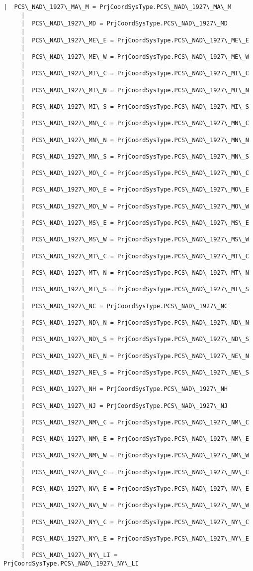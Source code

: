 \documentclass[11pt]{article}
\begin{document}
\begin{Verbatim}[commandchars=\\\{\}]
     |  PCS\_NAD\_1927\_MA\_M = PrjCoordSysType.PCS\_NAD\_1927\_MA\_M
     |  
     |  PCS\_NAD\_1927\_MD = PrjCoordSysType.PCS\_NAD\_1927\_MD
     |  
     |  PCS\_NAD\_1927\_ME\_E = PrjCoordSysType.PCS\_NAD\_1927\_ME\_E
     |  
     |  PCS\_NAD\_1927\_ME\_W = PrjCoordSysType.PCS\_NAD\_1927\_ME\_W
     |  
     |  PCS\_NAD\_1927\_MI\_C = PrjCoordSysType.PCS\_NAD\_1927\_MI\_C
     |  
     |  PCS\_NAD\_1927\_MI\_N = PrjCoordSysType.PCS\_NAD\_1927\_MI\_N
     |  
     |  PCS\_NAD\_1927\_MI\_S = PrjCoordSysType.PCS\_NAD\_1927\_MI\_S
     |  
     |  PCS\_NAD\_1927\_MN\_C = PrjCoordSysType.PCS\_NAD\_1927\_MN\_C
     |  
     |  PCS\_NAD\_1927\_MN\_N = PrjCoordSysType.PCS\_NAD\_1927\_MN\_N
     |  
     |  PCS\_NAD\_1927\_MN\_S = PrjCoordSysType.PCS\_NAD\_1927\_MN\_S
     |  
     |  PCS\_NAD\_1927\_MO\_C = PrjCoordSysType.PCS\_NAD\_1927\_MO\_C
     |  
     |  PCS\_NAD\_1927\_MO\_E = PrjCoordSysType.PCS\_NAD\_1927\_MO\_E
     |  
     |  PCS\_NAD\_1927\_MO\_W = PrjCoordSysType.PCS\_NAD\_1927\_MO\_W
     |  
     |  PCS\_NAD\_1927\_MS\_E = PrjCoordSysType.PCS\_NAD\_1927\_MS\_E
     |  
     |  PCS\_NAD\_1927\_MS\_W = PrjCoordSysType.PCS\_NAD\_1927\_MS\_W
     |  
     |  PCS\_NAD\_1927\_MT\_C = PrjCoordSysType.PCS\_NAD\_1927\_MT\_C
     |  
     |  PCS\_NAD\_1927\_MT\_N = PrjCoordSysType.PCS\_NAD\_1927\_MT\_N
     |  
     |  PCS\_NAD\_1927\_MT\_S = PrjCoordSysType.PCS\_NAD\_1927\_MT\_S
     |  
     |  PCS\_NAD\_1927\_NC = PrjCoordSysType.PCS\_NAD\_1927\_NC
     |  
     |  PCS\_NAD\_1927\_ND\_N = PrjCoordSysType.PCS\_NAD\_1927\_ND\_N
     |  
     |  PCS\_NAD\_1927\_ND\_S = PrjCoordSysType.PCS\_NAD\_1927\_ND\_S
     |  
     |  PCS\_NAD\_1927\_NE\_N = PrjCoordSysType.PCS\_NAD\_1927\_NE\_N
     |  
     |  PCS\_NAD\_1927\_NE\_S = PrjCoordSysType.PCS\_NAD\_1927\_NE\_S
     |  
     |  PCS\_NAD\_1927\_NH = PrjCoordSysType.PCS\_NAD\_1927\_NH
     |  
     |  PCS\_NAD\_1927\_NJ = PrjCoordSysType.PCS\_NAD\_1927\_NJ
     |  
     |  PCS\_NAD\_1927\_NM\_C = PrjCoordSysType.PCS\_NAD\_1927\_NM\_C
     |  
     |  PCS\_NAD\_1927\_NM\_E = PrjCoordSysType.PCS\_NAD\_1927\_NM\_E
     |  
     |  PCS\_NAD\_1927\_NM\_W = PrjCoordSysType.PCS\_NAD\_1927\_NM\_W
     |  
     |  PCS\_NAD\_1927\_NV\_C = PrjCoordSysType.PCS\_NAD\_1927\_NV\_C
     |  
     |  PCS\_NAD\_1927\_NV\_E = PrjCoordSysType.PCS\_NAD\_1927\_NV\_E
     |  
     |  PCS\_NAD\_1927\_NV\_W = PrjCoordSysType.PCS\_NAD\_1927\_NV\_W
     |  
     |  PCS\_NAD\_1927\_NY\_C = PrjCoordSysType.PCS\_NAD\_1927\_NY\_C
     |  
     |  PCS\_NAD\_1927\_NY\_E = PrjCoordSysType.PCS\_NAD\_1927\_NY\_E
     |  
     |  PCS\_NAD\_1927\_NY\_LI = PrjCoordSysType.PCS\_NAD\_1927\_NY\_LI

\end{Verbatim}
\end{document}
